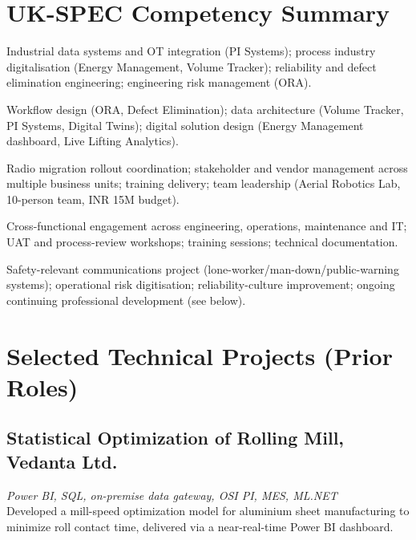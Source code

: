 \documentclass[11pt,a4paper]{article}
\begin{document}
\section*{UK-SPEC Competency Summary}
\begin{description}[style=nextline, leftmargin=1.4em, itemsep=4pt, topsep=2pt, parsep=0pt, font=\bfseries]
    \item[A - Knowledge \& Understanding] Industrial data systems
          and OT integration (PI Systems); process industry digitalisation
          (Energy Management, Volume Tracker); reliability and defect
          elimination engineering; engineering risk management (ORA).
    \item[B - Design \& Development] Workflow design (ORA, Defect
          Elimination); data architecture (Volume Tracker, PI Systems,
          Digital Twins); digital solution design (Energy Management
          dashboard, Live Lifting Analytics).
    \item[C - Responsibility \& Leadership] Radio migration
          rollout coordination; stakeholder and vendor management across
          multiple business units; training delivery; team leadership
          (Aerial Robotics Lab, 10-person team, INR 15M budget).
    \item[D - Communication] Cross-functional engagement across
          engineering, operations, maintenance and IT; UAT and process-review
          workshops; training sessions; technical documentation.
    \item[E - Professional Commitment] Safety-relevant
          communications project (lone-worker/man-down/public-warning
          systems); operational risk digitisation; reliability-culture
          improvement; ongoing continuing professional development (see
          below).
\end{description}

\section*{Selected Technical Projects (Prior Roles)}

\subsection*{Statistical Optimization of Rolling Mill, Vedanta Ltd.}
\textit{Power BI, SQL, on-premise data gateway, OSI PI, MES, ML.NET} \\
Developed a mill-speed optimization model for aluminium sheet manufacturing to
minimize roll contact time, delivered via a near-real-time Power BI dashboard.
\end{document}

